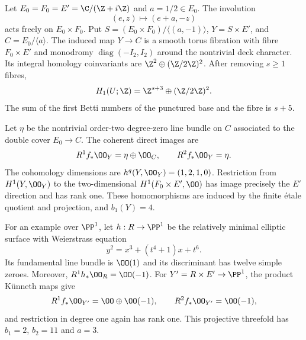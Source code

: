 \begin{proposition}\hypertarget{tag-01G3}{}\label{cdp:st:D.1.5}
Let $E_0=F_0=E'=\C/(\Z+i\Z)$ and $a=1/2\in E_0$.
The involution
\[
(e,z)\longmapsto(e+a,-z)
\]
acts freely on $E_0\times F_0$. Put
$S=(E_0\times F_0)/\langle(a,-1)\rangle$,
$Y=S\times E'$, and $C=E_0/\langle a\rangle$.
The induced map $Y\to C$ is a smooth torus fibration with fibre
$F_0\times E'$ and monodromy
$\operatorname{diag}(-I_2,I_2)$ around the nontrivial deck character.
Its integral homology coinvariants are
$\Z^2\oplus(\Z/2\Z)^2$. After removing $s\geq1$ fibres,
\[
H_1(U;\Z)=\Z^{s+3}\oplus(\Z/2\Z)^2.
\]
The sum of the first Betti numbers of the punctured base and the
fibre is $s+5$.

Let $\eta$ be the nontrivial order-two degree-zero line bundle on
$C$ associated to the double cover $E_0\to C$. The coherent direct
images are
\[
R^1f_*\OO_Y=\eta\oplus\OO_C,\qquad R^2f_*\OO_Y=\eta.
\]
The cohomology dimensions are $h^q(Y,\OO_Y)=(1,2,1,0)$.
Restriction from $H^1(Y,\OO_Y)$ to the two-dimensional
$H^1(F_0\times E',\OO)$ has image precisely the $E'$ direction
and has rank one. These homomorphisms are induced by the finite
\'etale quotient and projection, and $b_1(Y)=4$.

For an example over $\PP^1$, let
$h:R\to\PP^1$ be the relatively minimal elliptic surface with
Weierstrass equation
\[
y^2=x^3+(t^4+1)x+t^6.
\]
Its fundamental line bundle is $\OO(1)$ and its discriminant has
twelve simple zeroes. Moreover, $R^1h_*\OO_R=\OO(-1)$.
For $Y'=R\times E'\to\PP^1$, the product K\"unneth maps give
\[
R^1f_*\OO_{Y'}=\OO\oplus\OO(-1),\qquad
R^2f_*\OO_{Y'}=\OO(-1),
\]
and restriction in degree one again has rank one. This projective
threefold has $b_1=2$, $b_2=11$ and $a=3$.
\end{proposition}
